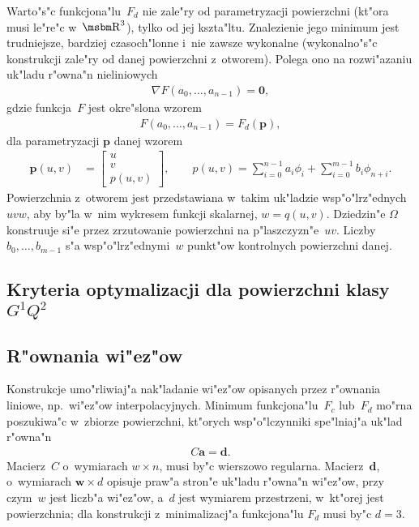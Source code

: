 Warto"s"c funkcjona"lu~$F_d$ nie zale"ry od parametryzacji powierzchni
(kt"ora musi le"re"c w~$\R^3$),
tylko od jej kszta"ltu. Znalezienie jego minimum jest trudniejsze, bardziej
czasoch"lonne i~nie zawsze wykonalne (wykonalno"s"c konstrukcji zale"ry od
danej powierzchni z~otworem). Polega ono na rozwi"azaniu uk"ladu r"owna"n
nieliniowych
\begin{align}
  \nabla F(a_0,\ldots,a_{n-1}) = \bm{0},
\end{align}
gdzie funkcja~$F$ jest okre"slona wzorem
\begin{align*}
  F(a_0,\ldots,a_{n-1}) = F_d(\bm{p}),
\end{align*}
dla parametryzacji $\bm{p}$ danej wzorem
\begin{align*}
  \bm{p}(u,v) &{}= \left[\begin{array}{c} u \\ v \\ p(u,v) \end{array}\right],
\qquad
  p(u,v) = \sum_{i=0}^{n-1}a_i\phi_i+\sum_{i=0}^{m-1}b_i\phi_{n+i}.
\end{align*}
Powierzchnia z~otworem jest przedstawiana w~takim uk"ladzie
wsp"o"lrz"ednych $uvw$, aby by"la w~nim wykresem funkcji skalarnej,
$w=q(u,v)$. Dziedzin"e $\varOmega$ konstruuje si"e przez zrzutowanie
powierzchni na p"laszczyzn"e~$uv$. Liczby $b_0,\ldots,b_{m-1}$ s"a
wsp"o"lrz"ednymi~$w$ punkt"ow kontrolnych powierzchni danej.


\subsection{Kryteria optymalizacji dla powierzchni klasy~$G^1Q^2$}

\subsection{R"ownania wi"ez"ow}

\begin{sloppypar}
Konstrukcje umo"rliwiaj"a nak"ladanie wi"ez"ow opisanych przez r"ownania
liniowe, np.\ wi"ez"ow interpolacyjnych. Minimum funkcjona"lu~$F_c$ lub~$F_d$
mo"rna poszukiwa"c w~zbiorze powierzchni, kt"orych wsp"o"lczynniki
spe"lniaj"a uk"lad r"owna"n
\begin{align}\label{eq:constraints}
  C\bm{a} = \bm{d}.
\end{align}
Macierz~$C$ o~wymiarach $w\times n$, musi by"c wierszowo regularna.
Macierz~$\bm{d}$, o~wymiarach $\bm{w}\times d$ opisuje praw"a stron"e
uk"ladu r"owna"n wi"ez"ow, przy czym~$w$ jest liczb"a wi"ez"ow, a~$d$ jest
wymiarem przestrzeni, w~kt"orej jest powierzchnia; dla konstrukcji
z~minimalizacj"a funkcjona"lu $F_d$ musi by"c $d=3$.
\end{sloppypar}

